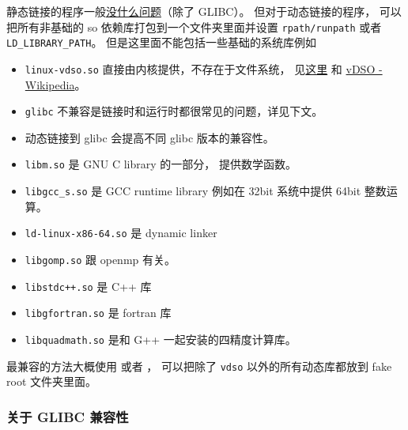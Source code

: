 静态链接的程序一般\href{https://stackoverflow.com/questions/31801824/is-static-linking-in-linux-portable}{没什么问题}（除了 GLIBC）。 但对于动态链接的程序， 可以把所有非基础的 so 依赖库打包到一个文件夹里面并设置 \verb`rpath/runpath` 或者 \verb`LD_LIBRARY_PATH`。 但是这里面不能包括一些基础的系统库例如
\begin{itemize}
\item \verb`linux-vdso.so` 直接由内核提供，不存在于文件系统， 见\href{https://unix.stackexchange.com/questions/476971/ldd-shows-no-location-after-arrow-library-does-not-exist-on-system}{这里} 和 \href{https://en.wikipedia.org/wiki/VDSO}{vDSO - Wikipedia}。
\item \verb`glibc` 不兼容是链接时和运行时都很常见的问题，详见下文。
\item 动态链接到 glibc 会提高不同 glibc 版本的兼容性。
\item \verb`libm.so` 是 GNU C library 的一部分， 提供数学函数。
\item \verb`libgcc_s.so` 是 GCC runtime library 例如在 32bit 系统中提供 64bit 整数运算。
\item \verb`ld-linux-x86-64.so` 是 dynamic linker
\item \verb`libgomp.so` 跟 openmp 有关。
\item \verb`libstdc++.so` 是 C++ 库
\item \verb`libgfortran.so` 是 fortran 库
\item \verb`libquadmath.so` 是和 G++ 一起安装的四精度计算库。
\end{itemize}

最兼容的方法大概使用  或者 ， 可以把除了 \verb`vdso` 以外的所有动态库都放到 fake root 文件夹里面。

\subsubsection{关于 GLIBC 兼容性}

